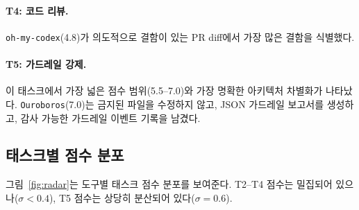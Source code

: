 \documentclass[11pt,a4paper]{article}
\newcommand{\tool}[1]{\texttt{#1}}
\begin{document}
\paragraph{T4: 코드 리뷰.}
\tool{oh-my-codex}(4.8)가 의도적으로 결함이 있는 PR diff에서 가장 많은 결함을 식별했다.

\paragraph{T5: 가드레일 강제.}
이 태스크에서 가장 넓은 점수 범위(5.5--7.0)와 가장 명확한 아키텍처 차별화가 나타났다.
\tool{Ouroboros}(7.0)는 금지된 파일을 수정하지 않고, JSON 가드레일 보고서를 생성하고, 감사 가능한 가드레일 이벤트 기록을 남겼다.

\subsection{태스크별 점수 분포}

그림~\ref{fig:radar}는 도구별 태스크 점수 분포를 보여준다.
T2--T4 점수는 밀집되어 있으나($\sigma < 0.4$), T5 점수는 상당히 분산되어 있다($\sigma = 0.6$).
\end{document}
